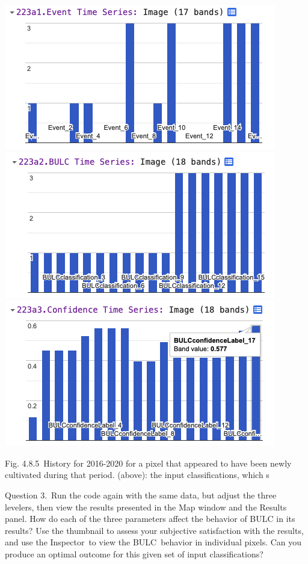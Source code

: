 \documentclass[
  letterpaper,
  DIV=11,
  numbers=noendperiod]{scrreprt}
\begin{document}
\includegraphics{./F4/image23.png}\includegraphics{./F4/image72.png}\includegraphics{./F4/image58.png}

Fig. 4.8.5~History for 2016-2020 for a pixel that appeared to have been
newly cultivated during that period. (above): the input classifications,
which s

Question 3.~Run the code again with the same data, but adjust the three
levelers, then view the results presented in the Map window and the
Results panel. How do each of the three parameters affect the behavior
of BULC in its results? Use the thumbnail to assess your subjective
satisfaction with the results, and use the Inspector~to view the
BULC~behavior in individual pixels. Can you produce an optimal outcome
for this given set of input classifications?
\end{document}

